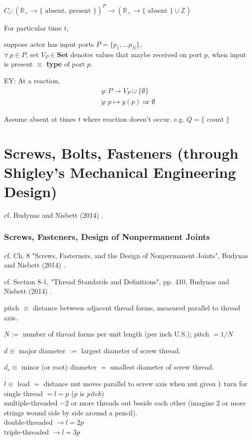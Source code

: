 \documentclass[10pt]{amsart}
\begin{document}
\begin{multicols*}{2}
$C_i:(\mathbb{R}_+ \to \lbrace \text{ absent, present } \rbrace )^P \to (\mathbb{R}_+ \to \lbrace \text{ absent } \rbrace \cup \mathbb{Z})$  

For particular time $t$, 

suppose actor has input ports $P=\lbrace p_1, \dots p_N \rbrace$, \\
$\forall \, p \in P$, set $V_P \in \mathbf{Set}$ denotes values that maybe received on port $p$, when input is present $\equiv$ \textbf{type} of port $p$.  

EY: At a reaction, 
\[
\begin{gathered}
	y: P \to V_P \cup \lbrace \emptyset \rbrace \\ 
	y: p \mapsto y(p) \text{ or } \emptyset 
\end{gathered}
\]

Assume absent at times $t$ where reaction doesn't occur.  
e.g. 
$Q = \lbrace \text{ count } \rbrace$ 






\part{Screws, Bolts, Fasteners (through Shigley's Mechanical Engineering Design)}

cf. Budynas and Nisbett (2014) \cite{BuNi2014}.  

\section{Screws, Fasteners, Design of Nonpermanent Joints}

cf. Ch. 8 "Screws, Fasterners, and the Design of Nonpermanent Joints", Budynas and Nisbett (2014) \cite{BuNi2014}.  

cf. Section 8-1, "Thread Standards and Definitions", pp. 410, Budynas and Nisbett (2014) \cite{BuNi2014}.  
 
pitch $\equiv $ distance between adjacent thread forms, measured parallel to thread axis.  

$N :=$ number of thread forms per unit length (per inch U.S.); pitch $=1/N$  

$d\equiv $ major diameter $:=$ largest diameter of screw thread.  

$d_r \equiv $ minor (or root) diameter $=$ smallest diameter of screw thread.  

$l \equiv $ lead $=$ distance nut moves parallel to screw axis when nut given $1$ turn for \\
single thread $=l=p$ ($p$ is \emph{pitch}) \\
multiple-threaded $- 2 $ or more threads out beside each other (imagine 2 or more strings wound side by side around a pencil).  \\
double-threaded $\to l = 2p$  \\
triple-threaded $\to l=3p$  


\end{multicols*}
\end{document}
